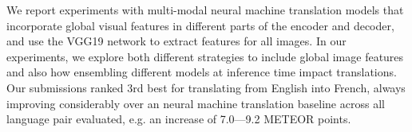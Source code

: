 We report experiments with multi-modal neural machine translation models that incorporate global visual features in different parts of the encoder and decoder, and use the VGG19 network to extract features for all images. In our experiments, we explore both different strategies to include global image features and also how ensembling different models at inference time impact translations. Our submissions ranked 3rd best for translating from English into French, always improving considerably over an neural machine translation baseline across all language pair evaluated, e.g. an increase of 7.0---9.2 METEOR points.
